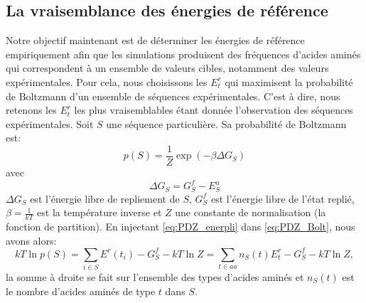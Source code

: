 \subsection{La vraisemblance des énergies de référence}

Notre objectif maintenant est de  déterminer les énergies de référence empiriquement afin que les simulations produisent des fréquences d'acides aminés qui correspondent à un ensemble de valeurs cibles, notamment des valeurs expérimentales. Pour cela, nous choisissons les $E_t^r$ qui maximisent la probabilité de Boltzmann d'un ensemble de séquences expérimentales.
C'est à dire, nous retenons les $E_t^r$ les plus vraisemblables étant donnée l'observation des séquences expérimentales. Soit $S$ une séquence particulière. Sa probabilité de Boltzmann est:
\begin{equation}
  \label{eq:PDZ_Bolt}
  p(S)=\frac{1}{Z}\exp(-\beta \Delta G_S)
\end{equation}
avec
\begin{equation}
  \label{eq:PDZ_enerpli}
  \Delta G_S=G_S^f - E^u_S
\end{equation}
$\Delta G_S$ est l'énergie libre de repliement de $S$, $G^f_S$ est l'énergie libre de l'état replié, $\beta =\frac{1}{kT}$ est la température inverse et $Z$ une constante de normalisation (la fonction de partition). En injectant \ref{eq:PDZ_enerpli} dans \ref{eq:PDZ_Bolt}, nous avons alors:
\begin{equation}
kT \ln p(S) = \sum_{i\in S} E^r(t_i) - G^f_S - kT \ln Z = \sum_{t\in aa}n_S(t)E^r_t - G^f_S - kT\ln Z,
\end{equation}
la somme à droite se fait sur l'ensemble des types d'acides aminés et $n_S(t)$ est le nombre d'acides aminés de type $t$ dans $S$.

